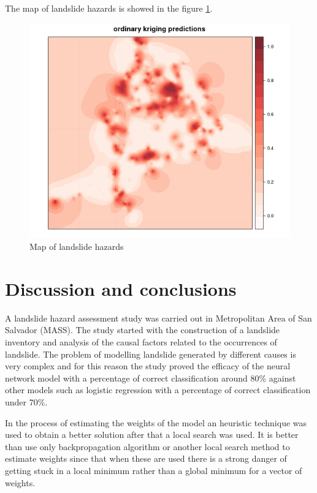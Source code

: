 \documentclass[11pt,twoside]{rmta2010esp}%
\begin{document}

The map of landslide hazards is showed in the figure \ref{fig:img02}.

 \begin{center}
  \begin{figure}[H]
   \centering
   \includegraphics[scale=0.40]{img02}
   \caption{\small{Map of landslide hazards}}
   \label{fig:img02}
  \end{figure}
 \end{center}


\section{Discussion and conclusions}
A landslide hazard assessment study was carried out in Metropolitan Area of San Salvador (MASS). The study started with the construction of a landslide inventory and analysis of the causal factors related to the occurrences of landslide. The problem of modelling landslide generated by different causes is very complex and for this reason the study proved the efficacy of the neural network model with a percentage of correct classification around 80\% against other models such as logistic regression with a percentage of correct classification under 70\%. 

In the process of estimating the weights of the model an heuristic technique was used to obtain a better solution after that a local search was used. It is better than use only backpropagation algorithm or another local search method to estimate weights since that when these are used there is a strong danger of getting stuck in a local minimum rather than a global minimum for a vector of weights.
\end{document}
